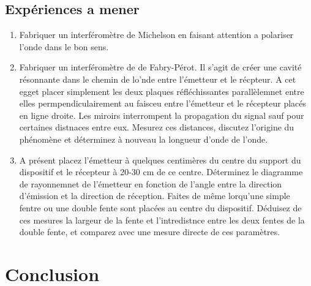 \documentclass[a4paper,11pt]{article}
\begin{document}
\subsection{Expériences a mener}
\begin{enumerate}
	\item Fabriquer un interféromètre de Michelson en faisant attention a polariser l'onde dans le bon sens.
	\item Fabriquer un interféromètre de de Fabry-Pérot. Il s'agit de créer une cavité résonnante dans le chemin de lo'nde entre l'émetteur et le récpteur. A cet egget placer simplement les deux plaques réfléchissantes parallèlemnet entre elles permpendiculairement au faisceu entre l'émetteur et le récepteur placés en ligne droite. Les miroirs interrompent la propagation du signal sauf pour certaines distnaces entre eux. Mesurez ces distances, discutez l'origine du phénomène et déterminez à nouveau la longueur d'onde de l'onde.
	\item A présent placez l'émetteur à quelques centimères du centre du support du dispositif et le récepteur à 20-30 cm de ce centre. Déterminez le diagramme de rayonnemnet de l'émetteur en fonction de l'angle entre la direction d'émission et la direction de réception. Faites de même lorqu'une simple fentre ou une double fente sont placées au centre du dispositif. Déduisez de ces mesures la largeur de la fente et l'intredistnce entre les deux fentes de la double fente, et comparez avec une mesure directe de ces paramètres.
\end{enumerate}

\section{Conclusion}
\end{document}
